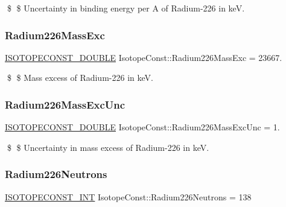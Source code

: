 \$ \$ Uncertainty in binding energy per A of Radium-\/226 in keV. \mbox{\label{group___isotope_const-_radium-_ra226_ga999c698402d6535af074218b4e19cc66}} 
\subsubsection{\texorpdfstring{Radium226\+Mass\+Exc}{Radium226MassExc}}
{\footnotesize\ttfamily \mbox{\hyperlink{group___isotope_const-_macros_ga8f45a7272ce02c0b4c65c44636ed719a}{I\+S\+O\+T\+O\+P\+E\+C\+O\+N\+S\+T\+\_\+\+D\+O\+U\+B\+LE}} Isotope\+Const\+::\+Radium226\+Mass\+Exc = 23667.}

\$ \$ Mass excess of Radium-\/226 in keV. \mbox{\label{group___isotope_const-_radium-_ra226_ga93c6959c64cc10cc6319dcc12ac78a2f}} 
\subsubsection{\texorpdfstring{Radium226\+Mass\+Exc\+Unc}{Radium226MassExcUnc}}
{\footnotesize\ttfamily \mbox{\hyperlink{group___isotope_const-_macros_ga8f45a7272ce02c0b4c65c44636ed719a}{I\+S\+O\+T\+O\+P\+E\+C\+O\+N\+S\+T\+\_\+\+D\+O\+U\+B\+LE}} Isotope\+Const\+::\+Radium226\+Mass\+Exc\+Unc = 1.}

\$ \$ Uncertainty in mass excess of Radium-\/226 in keV. \mbox{\label{group___isotope_const-_radium-_ra226_ga417a7146f3197ec047fb3291f77a068b}} 
\subsubsection{\texorpdfstring{Radium226\+Neutrons}{Radium226Neutrons}}
{\footnotesize\ttfamily \mbox{\hyperlink{group___isotope_const-_macros_ga5f18360b3e99483a35c32d789e62621c}{I\+S\+O\+T\+O\+P\+E\+C\+O\+N\+S\+T\+\_\+\+I\+NT}} Isotope\+Const\+::\+Radium226\+Neutrons = 138}

